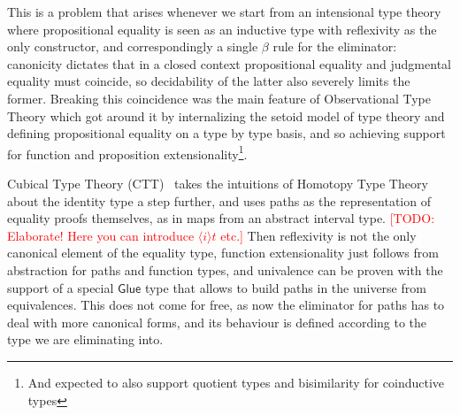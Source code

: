 \documentclass{book}
\newcommand{\TODO}[1]{\textcolor{red}{[TODO: #1]}}
\begin{document}
  This is a problem that arises whenever we start from an intensional
  type theory where propositional equality is seen as an inductive
  type with reflexivity as the only constructor, and correspondingly a
  single $\beta$ rule for the eliminator: canonicity dictates that in
  a closed context propositional equality and judgmental equality must
  coincide, so decidability of the latter also severely limits the
  former. Breaking this coincidence was the main feature of Observational Type Theory \cite{ottnow} which got around it by
  internalizing the setoid model of type theory and defining
  propositional equality on a type by type basis, and so achieving
  support for function and proposition extensionality\footnote{And expected to also support quotient types and bisimilarity for coinductive types}.

  Cubical Type Theory (CTT)~\cite{cohenCoquandHuberMortberg:cubical} takes the intuitions of Homotopy
  Type Theory about the identity type a step further, and uses paths
  as the representation of equality proofs themselves, as in maps from
  an abstract interval type.  \TODO{Elaborate!  Here you can introduce
    $\langle i \rangle t$ etc.}
  Then reflexivity is not the only
  canonical element of the equality type, function extensionality just
  follows from abstraction for paths and function types, and
  univalence can be proven with the support of a special
  $\mathsf{Glue}$ type that allows to build paths in the universe from
  equivalences. This does not come for free, as now the eliminator for
  paths has to deal with more canonical forms, and its
  behaviour is defined according to the type we are eliminating into.
\end{document}
